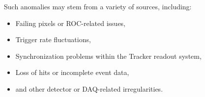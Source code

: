 Such anomalies may stem from a variety of sources, including:
\begin{itemize}
    \item Failing pixels or ROC-related issues,
    \item Trigger rate fluctuations,
    \item Synchronization problems within the Tracker readout system,
    \item Loss of hits or incomplete event data,
    \item and other detector or DAQ-related irregularities.
\end{itemize}
